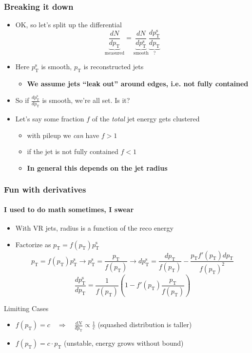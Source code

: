 \documentclass[xcolor={table}]{beamer}
\newcommand{\pt}{p_{\mathrm{T}}}
\newcommand{\ptr}{\pt}
\newcommand{\ptt}{\pt^{\text{s}}}
\begin{document}
\begin{frame}
  \frametitle{Breaking it down}
  \begin{itemize}
  \item OK, so let's split up the differential
    \[ \underbrace{\frac{dN}{d\ptr}}_{\text{measured}} = \underbrace{\frac{dN}{d\ptt}}_{\text{smooth}} \underbrace{\frac{d\ptt}{d\ptr}}_{?} \]
  \item Here $\ptt$ is smooth, $\ptr$ is reconstructed jets
    \begin{itemize}
    \item \textbf{We assume jets ``leak out'' around edges, i.e. not fully contained}
    \end{itemize}
  \item So if $\frac{d\ptt}{d\ptr}$ is smooth, we're all set. Is it?
  \item Let's say some fraction $f$ of the \emph{total} jet energy gets clustered
    \begin{itemize}
    \item with pileup we \emph{can} have $f > 1$
    \item if the jet is not fully contained $f < 1$
    \item \textbf{In general this depends on the jet radius}
    \end{itemize}
  \end{itemize}
\end{frame}
\begin{frame}
  \frametitle{Fun with derivatives}
  \framesubtitle{I used to do math sometimes, I swear}
  \begin{itemize}
  \item With VR jets, radius is a function of the reco energy
  \item Factorize as $\ptr = f(\ptr) \ptt$
    \[ \ptr = f(\ptr) \ptt \to \ptt = \frac{\ptr}{f(\ptr)} \to d\ptt = \frac{d\ptr}{f(\ptr)} - \frac{\ptr f'(\ptr) d\ptr}{f(\ptr)^2} \]
    \[ \frac{d\ptt}{d\ptr} = \frac{1}{f(\ptr)} \left( 1 - f'(\ptr) \frac{\ptr}{f(\ptr)} \right) \]
  \end{itemize}
  \begin{block}{Limiting Cases}
    \begin{itemize}
    \item $f(\ptr) = c \quad \Rightarrow \quad \frac{dN}{d\ptr} \propto \frac{1}{c}$ (squashed distribution is taller)
    \item $f(\ptr) = c \cdot \ptr$ (unstable, energy grows without bound)
    \end{itemize}
  \end{block}
\end{frame}
\end{document}
